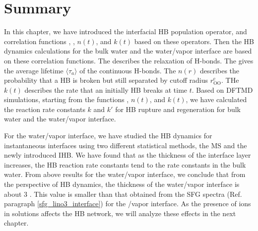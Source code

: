 \section{Summary}
In this chapter, we have introduced the interfacial HB population operator, 
and correlation functions \CHB, \SHB, $n(t)$, and $k(t)$ based on these operators. 
Then the HB dynamics calculations for the bulk water and the water/vapor interface are based on these correlation functions. 
The \CHB describes the relaxation of H-bonds. The \SHB gives the average lifetime $\langle \tau_a \rangle$ of the continuous H-bonds. 
The $n(r)$ describes the probability that a HB is broken but still separated by cutoff radius $r_\text{OO}^\text{c}$. 
THe $k(t)$ describes the rate that an initially HB breaks at time $t$.
Based on DFTMD simulations, starting from the functions \CHB, $n(t)$, and $k(t)$, 
we have calculated the reaction rate constants $k$ and $k'$ for HB rupture and regeneration for bulk water and the water/vapor interface.

For the water/vapor interface, we have studied the HB dynamics for instantaneous interfaces using two different statistical methods, the MS and the newly introduced IHB.
We have found that as the thickness of the interface layer increases, 
the HB reaction rate constants tend to the rate constants in the bulk water.
From above results for the water/vapor interface, we conclude that from the perspective of HB dynamics,
the thickness of the water/vapor interface is about 3 \A. This value is smaller than that obtained from the SFG spectra 
(Ref. paragraph \thinspace\ref{sfg_lino3_interface}) for the \LiN/vapor interface. 
As the presence of ions in solutions affects the HB network, we will analyze these effects in the next chapter.


